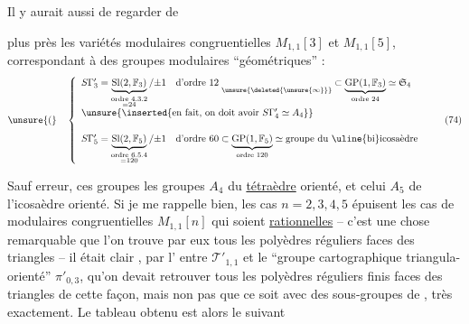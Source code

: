 Il y aurait  aussi de regarder de

plus près les variétés modulaires congruentielles
$M_{1,1}[3]$ et $M_{1,1}[5]$, correspondant à des
groupes modulaires ``géométriques'' :
\[
\unsure{(}\quad
\left\{
\begin{array}{l}
S\Gamma'_3 = \underbrace{\mathrm{Sl}(2,\mathbb F_3)}_{\substack{\text{ordre }4.3.2\\=24}}/\mathord{\pm}1
\quad \text{d'ordre }12\;\underset{\unsure{\deleted{\unsure{\infty}}}}{\phantom{a}}
\subset \underbrace{\mathrm{GP}(1,\mathbb F_3)}_{\text{ordre }24}\simeq\mathfrak S_4
\\[1.5em]
\unsure{\inserted{\text{en fait, on doit avoir } S\Gamma'_4\simeq A_4}}
\\[1.5em]
S\Gamma'_5 = \underbrace{\mathrm{Sl}(2,\mathbb F_5)}_{\substack{\text{ordre }6.5.4\\=120}}/\mathord{\pm}1
\quad \text{d'ordre }60
\subset \underbrace{\mathrm{GP}(1,\mathbb F_5)}_{\text{ordre }120}\simeq\text{groupe du \uline{bi}icosaèdre}
\end{array}
\right.
\tag{74}
\]

Sauf erreur, ces groupes   les groupes $A_4$ du
\uline{tétraèdre} orienté, et celui $A_5$ de l'icosaèdre
orienté. Si je me rappelle bien, les cas
$n=2,3,4,5$ épuisent les cas de  modulaires
congruentielles $M_{1,1}[n]$ qui soient \uline{rationnelles}
-- c'est une chose remarquable que l'on trouve
par eux tous les polyèdres réguliers   faces des
triangles  -- il était clair , par l' entre
$\mathcal T'_{1,1}$ et le ``groupe cartographique triangula- orienté'' $\pi'_{0,3}$,
qu'on devait retrouver tous
les polyèdres réguliers finis  faces des
triangles de cette façon, mais non pas que
ce soit avec des sous-groupes de ,
très exactement. Le tableau obtenu est
alors le suivant


